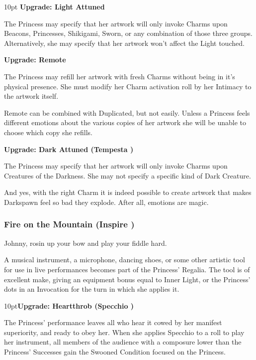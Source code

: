 \begin{myindentpar}{10pt}
\textbf{Upgrade: Light Attuned}

The Princess may specify that her artwork will only invoke Charms upon Beacons, Princesses, Shikigami, Sworn, or any combination of those three groups. Alternatively, she may specify that her artwork won't affect the Light touched. 

\textbf{Upgrade: Remote}

The Princess may refill her artwork with fresh Charms without being in it's physical presence. She must modify her Charm activation roll by her Intimacy to the artwork itself. 

Remote can be combined with Duplicated, but not easily. Unless a Princess feels different emotions about the various copies of her artwork she will be unable to choose which copy she refills.

\textbf{Upgrade: Dark Attuned (Tempesta \textbullet)}

The Princess may specify that her artwork will only invoke Charms upon Creatures of the Darkness. She may not specify a specific kind of Dark Creature. 

And yes, with the right Charm it is indeed possible to create artwork that makes Darkspawn feel so bad they explode. After all, emotions are magic. 
\end{myindentpar}


\subsubsection*{Fire on the Mountain (Inspire \textbullet)}

Johnny, rosin up your bow and play your fiddle hard.

A musical instrument, a microphone, dancing shoes, or some other artistic tool for use in live performances becomes part of the Princess' Regalia. The tool is of excellent make, giving an equipment bonus equal to Inner Light, or the Princess' dots in an Invocation for the turn in which she applies it. 

\begin{myindentpar}{10pt}\textbf{Upgrade: Heartthrob (Specchio \textbullet\textbullet)}

The Princess' performance leaves all who hear it cowed by her manifest superiority, and ready to obey her. When she applies Specchio to a roll to play her instrument, all members of the audience with a composure lower than the Princess' Successes gain the Swooned Condition focused on the Princess.\end{myindentpar}

